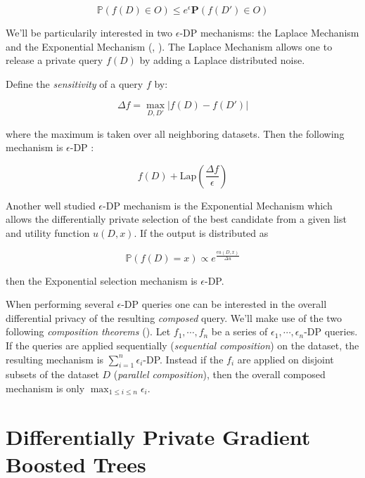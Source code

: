 \documentclass{article}
\theoremstyle{definition}
\begin{document}
\begin{equation*}
  \mathbb{P}\left( f(D) \in O \right) \leq e^{\epsilon} \mathbf{P}\left( f(D') \in O \right) 
\end{equation*}

We'll be particularily interested in two $\epsilon$-DP mechanisms: the Laplace Mechanism and the Exponential Mechanism (\cite{dwork2014}, \cite{mcsherry2007mechanism}). The Laplace Mechanism 
allows one to release a private query $f(D)$ by adding a Laplace distributed noise. 

Define the \textit{sensitivity} of a query $f$ by: 

\begin{equation*}
  \Delta f = \max_{D, D'} \vert f(D) - f(D') \vert 
\end{equation*}

where the maximum is taken over all neighboring datasets. Then the following mechanism is $\epsilon$-DP \cite{dwork2014}:

\begin{equation*}
  f(D) + \text{Lap}\left( \frac{\Delta f}{\epsilon} \right) 
\end{equation*}

Another well studied $\epsilon$-DP mechanism is the Exponential Mechanism \cite{mcsherry2007mechanism} which allows the differentially private 
selection of the best candidate from a given list and utility function $u(D, x)$. If the output is distributed as  

\begin{equation*} 
\mathbb{P}(f(D) = x) \propto e^{ \frac{\epsilon u(D,x)}{\Delta u} }
\end{equation*}

then the Exponential selection mechanism is $\epsilon$-DP. 

When performing several $\epsilon$-DP queries one can be interested in the overall differential privacy 
of the resulting \textit{composed} query. We'll make use of the two following \textit{composition theorems} (\cite{dwork2014}). 
Let $f_1, \cdots, f_n$ be a series of $\epsilon_1, \cdots, \epsilon_n$-DP queries. If the queries are applied sequentially (\textit{sequential composition}) on the dataset, the resulting mechanism 
is $\sum_{i=1}^{n} \epsilon_i$-DP. Instead if the $f_i$ are applied on disjoint subsets of the dataset $D$ (\textit{parallel composition}), then the overall composed mechanism is only $\max_{1 \leq i \leq n} \epsilon_i$. 


\section{Differentially Private Gradient Boosted Trees} 
\end{document}
